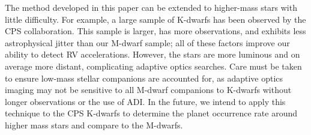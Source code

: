 The method developed in this paper can be extended to higher-mass stars with little difficulty. For example, a large sample of K-dwarfs has been observed by the CPS collaboration. This sample is larger, has more observations, and exhibits less astrophysical jitter than our M-dwarf sample; all of these factors improve our ability to detect RV accelerations. However, the stars are more luminous and on average more distant, complicating adaptive optics searches. Care must be taken to ensure low-mass stellar companions are accounted for, as adaptive optics imaging may not be sensitive to all M-dwarf companions to K-dwarfs without longer observations or the use of ADI. In the future, we intend to apply this technique to the CPS K-dwarfs to determine the planet occurrence rate around higher mass stars and compare to the M-dwarfs.

